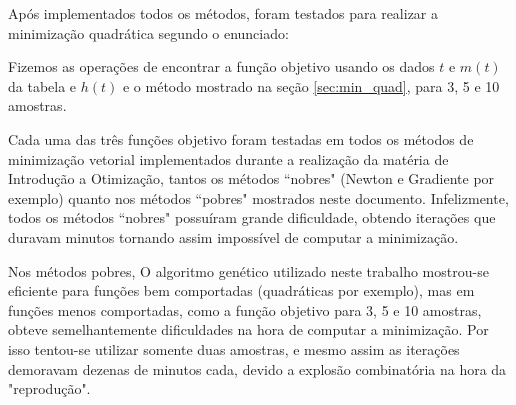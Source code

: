 Após implementados todos os métodos, foram testados para realizar a minimização quadrática segundo o enunciado:\\


\vspace{20pt}

Fizemos as operações de encontrar a função objetivo usando os dados $t$ e $m(t)$ da tabela e $h(t)$ e o método mostrado na seção \ref{sec:min_quad}, para 3, 5 e 10 amostras.

Cada uma das três funções objetivo foram testadas em todos os métodos de minimização vetorial implementados durante a realização da matéria de Introdução a Otimização, tantos os métodos ``nobres" (Newton e Gradiente por exemplo) quanto nos métodos ``pobres" mostrados neste documento. Infelizmente, todos os métodos ``nobres" possuíram grande dificuldade, obtendo iterações que duravam minutos tornando assim impossível de computar a minimização.

Nos métodos pobres, O algoritmo genético utilizado neste trabalho mostrou-se eficiente para funções bem comportadas (quadráticas por exemplo), mas em funções menos comportadas, como a função objetivo para 3, 5 e 10 amostras, obteve semelhantemente dificuldades na hora de computar a minimização. Por isso tentou-se utilizar somente duas amostras, e mesmo assim as iterações demoravam dezenas de minutos cada, devido a explosão combinatória na hora da "reprodução".\newpage

